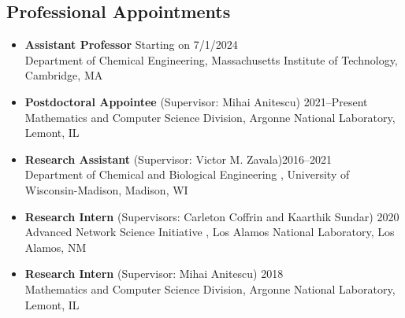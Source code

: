 \documentclass[letterpaper, 11pt]{article}
\begin{document}
\subsection*{Professional Appointments}
\begin{itemize}[itemsep=1pt, parsep=0pt,leftmargin=*]
\item[] {\bf Assistant Professor} \hfill Starting on 7/1/2024\\
  Department of Chemical Engineering, Massachusetts Institute of Technology, Cambridge, MA  
\item[] {\bf Postdoctoral Appointee} (Supervisor: Mihai Anitescu) \hfill 2021--Present\\
  Mathematics and Computer Science Division, Argonne National Laboratory, Lemont, IL
\item[] {\bf Research Assistant} (Supervisor: Victor M. Zavala)\hfill 2016--2021\\
  Department of Chemical and Biological Engineering , University of Wisconsin-Madison, Madison, WI 
\item[] {\bf Research Intern} (Supervisors: Carleton Coffrin and Kaarthik Sundar) \hfill 2020\\
  Advanced Network Science Initiative , Los Alamos National Laboratory, Los Alamos, NM  
\item[] {\bf Research Intern} (Supervisor: Mihai Anitescu) \hfill 2018\\
  Mathematics and Computer Science Division, Argonne National Laboratory, Lemont, IL
\end{itemize}

\end{document}
